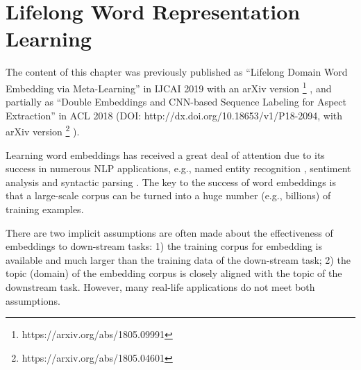 
\chapter{Lifelong Word Representation Learning}
\label{chap3:word}

The content of this chapter was previously published as ``Lifelong Domain Word Embedding via Meta-Learning'' in IJCAI 2019 \cite{xumeta} with an arXiv version \footnote{https://arxiv.org/abs/1805.09991} \cite{xu2018lifelong}, and partially as ``Double Embeddings and CNN-based Sequence Labeling for Aspect Extraction'' in ACL 2018 \cite{xu_acl2018} (DOI: http://dx.doi.org/10.18653/v1/P18-2094, with arXiv version \footnote{https://arxiv.org/abs/1805.04601} \cite{xu2018double}).

Learning word embeddings \cite{mnih2007three,mikolov2013efficient,mikolov2013distributed,pennington2014glove}
has received a great deal of attention due to its success in numerous NLP applications, e.g., named entity recognition \cite{sienvcnik2015adapting}, sentiment analysis \cite{maas2011learning} and syntactic parsing \cite{durrett2015neural}.
The key to the success of word embeddings is that a large-scale corpus can be turned into a huge number (e.g., billions) of training examples.

There are two implicit assumptions are often made about the effectiveness of embeddings to down-stream tasks: 
1) the training corpus for embedding is available and much larger than the training data of the down-stream task; 2) the topic (domain) of the embedding corpus is closely aligned with the topic of the downstream task.
However, many real-life applications do not meet both assumptions.

